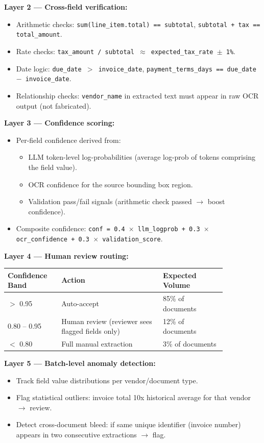 \textbf{Layer 2 --- Cross-field verification:}
\begin{itemize}
  \item Arithmetic checks: \texttt{sum(line\_item.total) == subtotal}, \texttt{subtotal + tax == total\_amount}.
  \item Rate checks: \texttt{tax\_amount / subtotal $\approx$ expected\_tax\_rate $\pm$ 1\%}.
  \item Date logic: \texttt{due\_date $>$ invoice\_date}, \texttt{payment\_terms\_days == due\_date $-$ invoice\_date}.
  \item Relationship checks: \texttt{vendor\_name} in extracted text must appear in raw OCR output (not fabricated).
\end{itemize}

\textbf{Layer 3 --- Confidence scoring:}
\begin{itemize}
  \item Per-field confidence derived from:
    \begin{itemize}
      \item LLM token-level log-probabilities (average log-prob of tokens comprising the field value).
      \item OCR confidence for the source bounding box region.
      \item Validation pass/fail signals (arithmetic check passed $\rightarrow$ boost confidence).
    \end{itemize}
  \item Composite confidence: \texttt{conf = 0.4 $\times$ llm\_logprob + 0.3 $\times$ ocr\_confidence + 0.3 $\times$ validation\_score}.
\end{itemize}

\textbf{Layer 4 --- Human review routing:}

\begin{tabular}{|p{0.20\linewidth}|p{0.40\linewidth}|p{0.25\linewidth}|}
\hline
\textbf{Confidence Band} & \textbf{Action} & \textbf{Expected Volume} \\
\hline
$>$ 0.95 & Auto-accept & 85\% of documents \\
\hline
0.80 -- 0.95 & Human review (reviewer sees flagged fields only) & 12\% of documents \\
\hline
$<$ 0.80 & Full manual extraction & 3\% of documents \\
\hline
\end{tabular}

\textbf{Layer 5 --- Batch-level anomaly detection:}
\begin{itemize}
  \item Track field value distributions per vendor/document type.
  \item Flag statistical outliers: invoice total 10x historical average for that vendor $\rightarrow$ review.
  \item Detect cross-document bleed: if same unique identifier (invoice number) appears in two consecutive extractions $\rightarrow$ flag.
\end{itemize}

